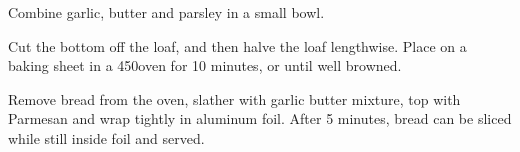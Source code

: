 \begin{recipe}

Combine garlic, butter and parsley in a small bowl.

\columnbreak


Cut the bottom off the loaf, and then halve the loaf lengthwise. Place on a baking sheet in a 450\degree oven for 10 minutes, or until well browned.


Remove bread from the oven, slather with garlic butter mixture, top with Parmesan and wrap tightly in aluminum foil.
After 5 minutes, bread can be sliced while still inside foil and served.

\end{recipe}
